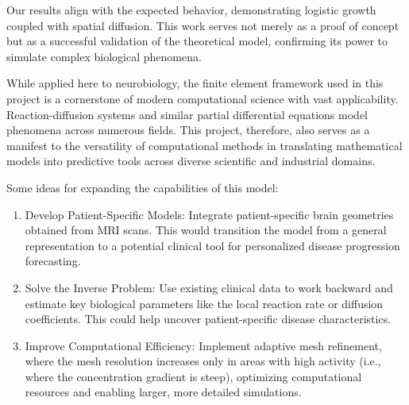 \documentclass[12pt, a4paper, twoside, openright]{report}
\begin{document}
Our results align with the expected behavior, demonstrating logistic growth coupled with spatial diffusion. This work serves not merely as a proof of concept but as a successful validation of the theoretical model, confirming its power to simulate complex biological phenomena.

While applied here to neurobiology, the finite element framework used in this project is a cornerstone of modern computational science with vast applicability. Reaction-diffusion systems and similar partial differential equations model phenomena across numerous fields.
This project, therefore, also serves as a manifest to the versatility of computational methods in translating mathematical models into predictive tools across diverse scientific and industrial domains.

Some ideas for expanding the capabilities of this model:

\begin{enumerate}
    \item Develop Patient-Specific Models: Integrate patient-specific brain geometries obtained from MRI scans. This would transition the model from a general representation to a potential clinical tool for personalized disease progression forecasting.
    \item Solve the Inverse Problem: Use existing clinical data to work backward and estimate key biological parameters like the local reaction rate or diffusion coefficients. This could help uncover patient-specific disease characteristics.
    \item Improve Computational Efficiency: Implement adaptive mesh refinement, where the mesh resolution increases only in areas with high activity (i.e., where the concentration gradient is steep), optimizing computational resources and enabling larger, more detailed simulations.
\end{enumerate}

\nocite{*}
 
 







\end{document}
